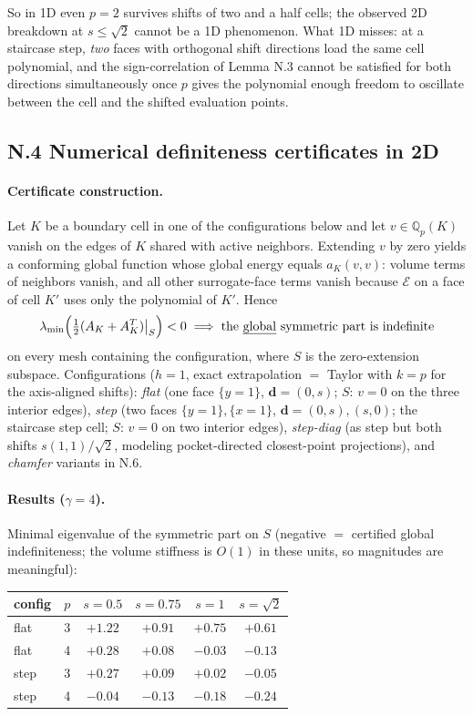 So in 1D even $p=2$ survives shifts of two and a half cells; the observed
2D breakdown at $s \le \sqrt2$ cannot be a 1D phenomenon. What 1D misses:
at a staircase step, \emph{two} faces with orthogonal shift directions load
the same cell polynomial, and the sign-correlation of Lemma N.3 cannot be
satisfied for both directions simultaneously once $p$ gives the polynomial
enough freedom to oscillate between the cell and the shifted evaluation
points.

\subsection*{N.4 Numerical definiteness certificates in 2D}

\paragraph{Certificate construction.} Let $K$ be a boundary cell in one of
the configurations below and let $v \in \mathbb Q_p(K)$ vanish on the edges
of $K$ shared with active neighbors. Extending $v$ by zero yields a
conforming global function whose global energy equals $a_K(v,v)$: volume
terms of neighbors vanish, and all other surrogate-face terms vanish
because $\mathcal E$ on a face of cell $K'$ uses only the polynomial of
$K'$. Hence
\[
  \lambda_{\min}\Big( \tfrac12 (A_K + A_K^T)\big|_{S} \Big) < 0
  \;\Longrightarrow\;
  \text{the \emph{global} symmetric part is indefinite}
\]
on every mesh containing the configuration, where $S$ is the zero-extension
subspace. Configurations ($h=1$, exact extrapolation $=$ Taylor with $k=p$
for the axis-aligned shifts):
\emph{flat} (one face $\{y{=}1\}$, $\mathbf d = (0,s)$; $S$: $v=0$ on the
three interior edges), \emph{step} (two faces $\{y{=}1\},\{x{=}1\}$,
$\mathbf d = (0,s),(s,0)$; the staircase step cell; $S$: $v=0$ on two
interior edges), \emph{step-diag} (as step but both shifts
$s(1,1)/\sqrt2$, modeling pocket-directed closest-point projections), and
\emph{chamfer} variants in N.6.

\paragraph{Results ($\gamma = 4$).} Minimal eigenvalue of the symmetric
part on $S$ (negative $=$ certified global indefiniteness; the volume
stiffness is $O(1)$ in these units, so magnitudes are meaningful):

\begin{center}
\begin{tabular}{llcccc}
\hline
config & $p$ & $s=0.5$ & $s=0.75$ & $s=1$ & $s=\sqrt2$ \\
\hline
flat  & 3 & $+1.22$ & $+0.91$ & $+0.75$ & $+0.61$ \\
flat  & 4 & $+0.28$ & $+0.08$ & $\mathbf{-0.03}$ & $\mathbf{-0.13}$ \\
step  & 3 & $+0.27$ & $+0.09$ & $+0.02$ & $\mathbf{-0.05}$ \\
step  & 4 & $\mathbf{-0.04}$ & $\mathbf{-0.13}$ & $\mathbf{-0.18}$ & $\mathbf{-0.24}$ \\
\hline
\end{tabular}
\end{center}

